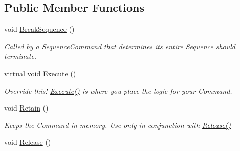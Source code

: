 \subsection*{Public Member Functions}
\begin{DoxyCompactItemize}
\item 
\hypertarget{classstrange_1_1extensions_1_1sequencer_1_1impl_1_1_sequence_command_a3eb9670db9fd5b07b7004be5acb9e266}{void \hyperlink{classstrange_1_1extensions_1_1sequencer_1_1impl_1_1_sequence_command_a3eb9670db9fd5b07b7004be5acb9e266}{Break\-Sequence} ()}\label{classstrange_1_1extensions_1_1sequencer_1_1impl_1_1_sequence_command_a3eb9670db9fd5b07b7004be5acb9e266}

\begin{DoxyCompactList}\small\item\em Called by a \hyperlink{classstrange_1_1extensions_1_1sequencer_1_1impl_1_1_sequence_command}{Sequence\-Command} that determines its entire Sequence should terminate. \end{DoxyCompactList}\item 
\hypertarget{classstrange_1_1extensions_1_1sequencer_1_1impl_1_1_sequence_command_a6debd17d38f4d90dce14857a695f7c7f}{virtual void \hyperlink{classstrange_1_1extensions_1_1sequencer_1_1impl_1_1_sequence_command_a6debd17d38f4d90dce14857a695f7c7f}{Execute} ()}\label{classstrange_1_1extensions_1_1sequencer_1_1impl_1_1_sequence_command_a6debd17d38f4d90dce14857a695f7c7f}

\begin{DoxyCompactList}\small\item\em Override this! {\ttfamily \hyperlink{classstrange_1_1extensions_1_1sequencer_1_1impl_1_1_sequence_command_a6debd17d38f4d90dce14857a695f7c7f}{Execute()}} is where you place the logic for your Command. \end{DoxyCompactList}\item 
\hypertarget{classstrange_1_1extensions_1_1sequencer_1_1impl_1_1_sequence_command_a9c7fe29154b21cdd9ea70c4865707b01}{void \hyperlink{classstrange_1_1extensions_1_1sequencer_1_1impl_1_1_sequence_command_a9c7fe29154b21cdd9ea70c4865707b01}{Retain} ()}\label{classstrange_1_1extensions_1_1sequencer_1_1impl_1_1_sequence_command_a9c7fe29154b21cdd9ea70c4865707b01}

\begin{DoxyCompactList}\small\item\em Keeps the Command in memory. Use only in conjunction with {\ttfamily \hyperlink{classstrange_1_1extensions_1_1sequencer_1_1impl_1_1_sequence_command_aacc937245572b5b026a079bb0527f58a}{Release()}} \end{DoxyCompactList}\item 
\hypertarget{classstrange_1_1extensions_1_1sequencer_1_1impl_1_1_sequence_command_aacc937245572b5b026a079bb0527f58a}{void \hyperlink{classstrange_1_1extensions_1_1sequencer_1_1impl_1_1_sequence_command_aacc937245572b5b026a079bb0527f58a}{Release} ()}\label{classstrange_1_1extensions_1_1sequencer_1_1impl_1_1_sequence_command_aacc937245572b5b026a079bb0527f58a}


\end{DoxyCompactItemize}
